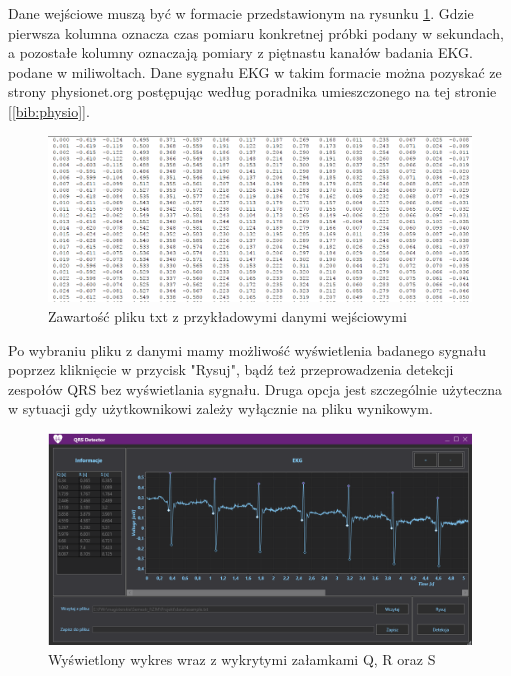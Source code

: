 \documentclass[11pt]{report}
\begin{document}
	Dane wejściowe muszą być w formacie przedstawionym na rysunku \ref{fig:wejscie}. Gdzie pierwsza kolumna oznacza czas pomiaru konkretnej próbki podany w sekundach, a pozostałe kolumny oznaczają pomiary z piętnastu kanałów badania EKG. podane w miliwoltach. Dane sygnału EKG w takim formacie można pozyskać ze strony physionet.org postępując według poradnika umieszczonego na tej stronie [\ref{bib:physio}].
	\begin{figure} [H]
		\centering
		\includegraphics[width=1\linewidth]{wejscie.png}
		\caption{Zawartość pliku txt z przykładowymi danymi wejściowymi}
		\label{fig:wejscie}
	\end{figure}
	\vspace{2cm}

	Po wybraniu pliku z danymi mamy możliwość wyświetlenia badanego sygnału poprzez kliknięcie w przycisk "Rysuj", bądź też przeprowadzenia detekcji zespołów QRS bez wyświetlania sygnału. Druga opcja jest szczególnie użyteczna w sytuacji gdy użytkownikowi zależy wyłącznie na pliku wynikowym.
		
	\begin{figure} [H]
		\centering
		\includegraphics[width=1\linewidth]{wykres.png}
		\caption{Wyświetlony wykres wraz z wykrytymi załamkami Q, R oraz S}
		\label{fig:wykresy}
	\end{figure}
	\vspace{2cm}
	
\end{document}
